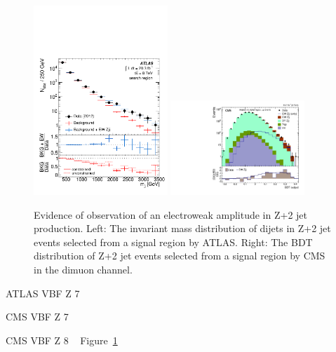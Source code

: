 \begin{figure}[p]
    \centering
    \includegraphics[width=0.45\textwidth]{figures/ss-exclboson-z2j-atlas8tev.pdf}
    \includegraphics[width=0.45\textwidth]{figures/ss-exclboson-z2j-cms8tev.pdf}
    \caption{Evidence of observation of an electroweak amplitude in Z+2 jet production.
    Left:  The invariant mass distribution of dijets in Z+2 jet events selected
     from a signal region by ATLAS. 
    Right:  The BDT distribution of Z+2 jet events selected from a signal region
    by CMS in the dimuon channel.}
    \label{fig:ss-exclboson-z2j-8tev}
\end{figure}
ATLAS VBF Z 7 \TeV~\cite{Aad:2014dta}

CMS VBF Z 7 \TeV~\cite{Chatrchyan:2013jya}

CMS VBF Z 8 \TeV~\cite{Khachatryan:2014dea}
Figure~\ref{fig:ss-exclboson-z2j-8tev}
